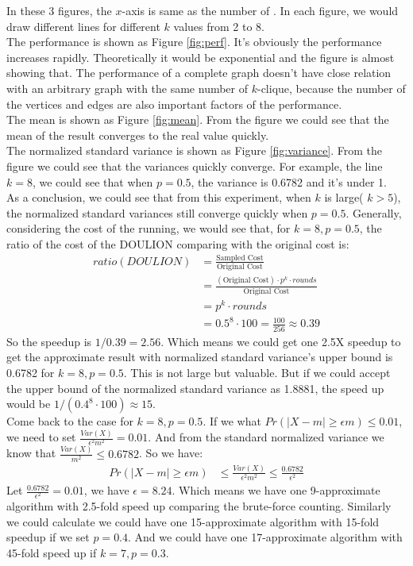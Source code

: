 In these 3 figures, the $x$-axis is same as the number of . In each figure, we would draw different lines for different $k$ values from 2 to 8. \\
The performance is shown as Figure \ref{fig:perf}. It's obviously the performance increases rapidly. Theoretically it would be exponential and the figure is almost showing that. The performance of a complete graph doesn't have close relation with an arbitrary graph with the same number of $k$-clique, because the number of the vertices and edges are also important factors of the performance. \\
The mean is shown as Figure \ref{fig:mean}. From the figure we could see that the mean of the result converges to the real value quickly. \\
The normalized standard variance is shown as Figure \ref{fig:variance}. From the figure we could see that the variances quickly converge. For example, the line $k=8$, we could see that when $p = 0.5$, the variance is 0.6782 and it's under 1. \\
As a conclusion, we could see that from this experiment, when $k$ is large( $k > 5$), the normalized standard variances still converge quickly when $p = 0.5$. Generally, considering the cost of the running, we would see that, for $k = 8, p=0.5$, the ratio of the cost of the DOULION comparing with the original cost is: \\
\[
        \begin{split}
ratio(DOULION) &= \frac{\text{Sampled Cost}}{\text{Original Cost}} \\
&= \frac{(\text{Original Cost}) \cdot p^k \cdot rounds}{\text{Original Cost}} \\
&=  p^k \cdot rounds \\
&= 0.5^8 \cdot 100 = \frac{100}{256} \approx 0.39
        \end{split}
\]
So the speedup is $1/0.39 = 2.56$. Which means we could get one 2.5X speedup to get the approximate result with normalized standard variance's upper bound is 0.6782 for $k=8, p = 0.5$. This is not large but valuable. But if we could accept the upper bound of the normalized standard variance as 1.8881, the speed up would be $1/(0.4^8 \cdot 100) \approx 15$. \\
Come back to the case for $k=8, p = 0.5$. If we what $Pr(|X - m| \geq \epsilon m)  \leq 0.01$, we need to set $\frac{Var(X)}{\epsilon^2 m^2} = 0.01$. And from the standard normalized variance we know that $\frac{Var(X)}{m^2} \leq 0.6782$. So we have: \\
\[
        \begin{split}
Pr(|X - m| \geq \epsilon m)  &\leq \frac{Var(X)}{\epsilon^2 m^2} \leq \frac{0.6782}{\epsilon^2}
        \end{split}
\]
Let $ \frac{0.6782}{\epsilon^2} = 0.01$, we have $\epsilon = 8.24$. Which means we have one 9-approximate algorithm with 2.5-fold speed up comparing the brute-force counting. Similarly we could calculate we could have one 15-approximate algorithm with 15-fold speedup if we set $p = 0.4$. And we could have one 17-approximate algorithm with 45-fold speed up if $k = 7, p = 0.3$.

